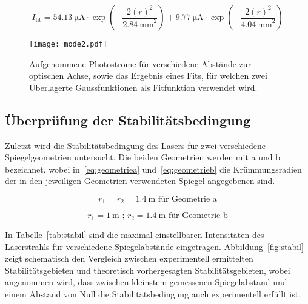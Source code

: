 \begin{equation}
I_\text{fit} = 
\SI{54.13}{\micro\ampere}\cdot 
\exp{\left(-\frac{2(r)^2}{\SI{2.84}{\milli\metre}^2}\right)}+
\SI{9.77}{\micro\ampere}\cdot 
\exp{\left(-\frac{2(r)^2}{\SI{4.04}{\milli\metre}^2}\right)}
\label{eq:zweigaussfit}
\end{equation}

%
\begin{figure}
\centering
  \texttt{[image: mode2.pdf]}
  \caption{Aufgenommene Photoströme für verschiedene Abstände 
zur optischen Achse, sowie das Ergebnis eines Fits, für welchen 
zwei Überlagerte Gaussfunktionen als Fitfunktion verwendet wird.}
\label{fig:mode2}
\end{figure}
%

\FloatBarrier

\subsection{Überprüfung der Stabilitätsbedingung}
%
Zuletzt wird die Stabilitätsbedingung des Lasers für 
zwei verschiedene Spiegelgeometrien untersucht.
Die beiden Geometrien werden mit a und b bezeichnet, 
wobei in~\eqref{eq:geometriea} 
und~\eqref{eq:geometrieb} die Krümmungsradien der 
in den jeweiligen Geometrien verwendeten Spiegel 
angegebenen sind.

\begin{equation}
r_1 = r_2 = \SI{1.4}{\metre}\text{ für Geometrie a}
\label{eq:geometriea}
\end{equation} 

\begin{equation}
r_1 = \SI{1}{\metre}\text{ ; }r_2=\SI{1.4}{\metre}\text{ für Geometrie b}
\label{eq:geometrieb}
\end{equation}

In Tabelle~\ref{tab:stabil} sind die maximal einstellbaren 
Intensitäten des Laserstrahls für verschiedene Spiegelabstände 
eingetragen. Abbildung~\ref{fig:stabil} zeigt schematisch den 
Vergleich zwischen experimentell ermittelten Stabilitätsgebieten 
und theoretisch vorhergesagten Stabilitätsgebieten, wobei 
angenommen wird, dass zwischen kleinstem gemessenen 
Spiegelabstand und einem Abstand von Null die 
Stabilitätsbedingung auch experimentell erfüllt ist.

